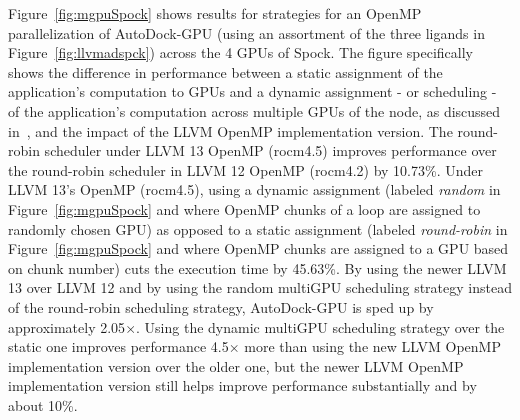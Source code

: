Figure~\ref{fig:mgpuSpock} shows results for strategies for an OpenMP parallelization of AutoDock-GPU (using an assortment of the three ligands in Figure~\ref{fig:llvmadspck}) across the 4 GPUs of Spock. The figure specifically shows the difference in performance between a static assignment of the application's computation to GPUs and a dynamic assignment - or scheduling - of the application's computation across multiple GPUs of the node, as discussed in~\cite{9669317}, and the impact of the LLVM OpenMP implementation version. The round-robin scheduler under LLVM 13 OpenMP (rocm4.5) improves performance over the round-robin scheduler in LLVM 12 OpenMP (rocm4.2) by 10.73\%. Under LLVM 13’s OpenMP (rocm4.5), using a dynamic assignment (labeled \textit{random} in Figure~\ref{fig:mgpuSpock} and where OpenMP chunks of a loop are assigned to randomly chosen GPU) as opposed to a static assignment (labeled \textit{round-robin} in Figure~\ref{fig:mgpuSpock} and where OpenMP chunks are assigned to a GPU based on chunk number) cuts the execution time by 45.63\%. By using the newer LLVM 13 over LLVM 12 and by using the random multiGPU scheduling strategy instead of the round-robin scheduling strategy, AutoDock-GPU is sped up by approximately 2.05$\times$. Using the dynamic multiGPU scheduling strategy over the static one improves performance 4.5$\times$ more than using the new LLVM OpenMP implementation version over the older one, but the newer LLVM OpenMP implementation version still helps improve performance substantially and by about 10\%. 
